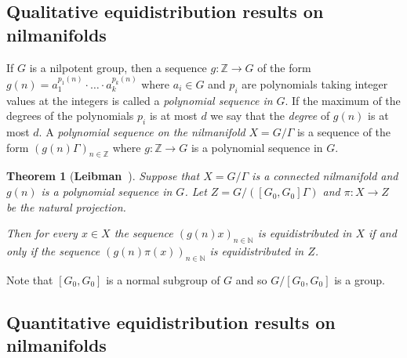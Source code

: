 \documentclass[11pt]{amsart}
\newcommand{\gG}{\Gamma}
\newcommand{\Z}{\mathbb{Z}}
\theoremstyle{plain}
\newtheorem{theorem}{Theorem}[section]
\theoremstyle{definition}
\theoremstyle{remark}
\begin{document}



\subsection{Qualitative equidistribution results on nilmanifolds}
If $G$ is a nilpotent group, then a sequence $g\colon \Z\to G$ of the
form $g(n)=a_1^{p_1(n)}\cdot\ldots\cdot a_k^{p_k(n)}$ where $a_i\in G$
and $p_i$ are polynomials taking integer values at the integers is
called a \emph{polynomial sequence in} $G$. If the maximum of the
degrees of the polynomials $p_i$ is at most $d$ we say that the
\emph{degree} of $g(n)$ is at most $d$.
A \emph{polynomial sequence on the
  nilmanifold} $X=G/\Gamma$ is a sequence of the form
$(g(n)\Gamma)_{n\in\Z}$ where $g\colon \Z\to G$ is a polynomial
sequence in $G$.

\begin{theorem}[{\bf Leibman~\cite{L2}}]\label{T:L}
  Suppose that $X = G/\gG$ is a connected nilmanifold and $g(n)$ is a
  polynomial sequence in $G$. Let $Z=G/([G_0,G_0]\Gamma)$ and
  $\pi\colon X\to Z$ be the natural projection.

  Then  for every   $x\in X$ the
  sequence $(g(n)x)_{n\in\mathbb{N}}$ is equidistributed in $X$ if and
  only if the sequence  $(g(n)\pi(x))_{n\in\mathbb{N}}$ is equidistributed in $Z$.
\end{theorem}
Note that $[G_0,G_0]$ is a normal subgroup of $G$ and so $G/[G_0,G_0]$
is a group.

\subsection{Quantitative equidistribution results on nilmanifolds}
\end{document}
